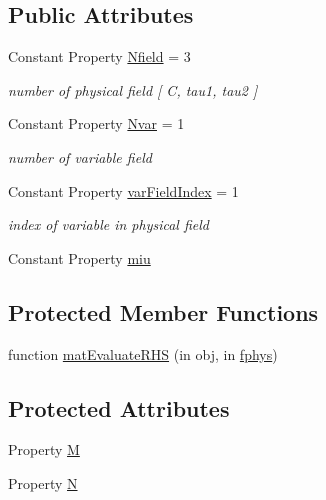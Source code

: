 \subsection*{Public Attributes}
\begin{DoxyCompactItemize}
\item 
Constant Property \hyperlink{class_diffusion_abstract2d_aa7e34b14d43e21039a339a832cc498b7}{Nfield} = 3
\begin{DoxyCompactList}\small\item\em number of physical field \mbox{[} C, tau1, tau2 \mbox{]} \end{DoxyCompactList}\item 
Constant Property \hyperlink{class_diffusion_abstract2d_a529cab38446e4f35dbfa06777f557fd9}{Nvar} = 1
\begin{DoxyCompactList}\small\item\em number of variable field \end{DoxyCompactList}\item 
Constant Property \hyperlink{class_diffusion_abstract2d_a54399b115ac6a84e82c38acc0c070cb0}{var\+Field\+Index} = 1
\begin{DoxyCompactList}\small\item\em index of variable in physical field \end{DoxyCompactList}\item 
Constant Property \hyperlink{class_diffusion_abstract2d_a833d7c0d21058cd25248b9714680ef40}{miu}
\end{DoxyCompactItemize}
\subsection*{Protected Member Functions}
\begin{DoxyCompactItemize}
\item 
function \hyperlink{class_diffusion_abstract2d_a96278c5ddb6db7ed940149e746fdc4fd}{mat\+Evaluate\+R\+HS} (in obj, in \hyperlink{class_ndg_phys_a6b25724fc9474d32018439009072f0a9}{fphys})
\end{DoxyCompactItemize}
\subsection*{Protected Attributes}
\begin{DoxyCompactItemize}
\item 
Property \hyperlink{class_diffusion_abstract2d_ae24f2afba1fab7ed9f4b570ee7bdf7a6}{M}
\item 
Property \hyperlink{class_diffusion_abstract2d_a58f5ba93eb64f8834186ac7831c7a5a2}{N}
\end{DoxyCompactItemize}


